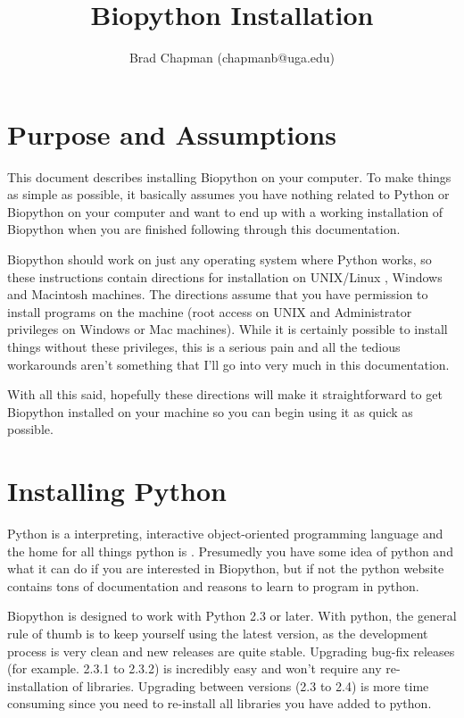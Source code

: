 \documentclass{article}
\begin{document}
\title{Biopython Installation}
\author{Brad Chapman (chapmanb@uga.edu)}

\maketitle
\tableofcontents

\section{Purpose and Assumptions}

This document describes installing Biopython on your computer. To make
things as simple as possible, it basically assumes you have nothing
related to Python or Biopython on your computer and want to end up with
a working installation of Biopython when you are finished following
through this documentation. 


Biopython should work on just any operating system where Python works,
so these instructions contain directions for installation on UNIX/Linux
, Windows and Macintosh machines. The directions assume 
that you have permission to install programs on the machine
(root access on UNIX and Administrator privileges on Windows or Mac
machines). While it is certainly possible to install things without
these privileges, this is a serious pain and all the tedious workarounds
aren't something that I'll go into very much in this documentation.

With all this said, hopefully these directions will make it
straightforward to get Biopython installed on your machine so you can
begin using it as quick as possible.

\section{Installing Python}

Python is a interpreting, interactive object-oriented programming
language and the home for all things python is
. Presumedly you have some idea of
python and what it can do if you are interested in Biopython, but if not
the python website contains tons of documentation and reasons to learn
to program in python.


Biopython is designed to work with Python 2.3 or later. With python, the
general rule of thumb is to keep yourself using the latest version, as
the development process is very clean and new releases are quite stable.
Upgrading bug-fix releases (for example. 2.3.1 to 2.3.2) 
is incredibly easy and won't require any re-installation of libraries.
Upgrading between versions (2.3 to 2.4) is more time consuming since you
need to re-install all libraries you have added to python.
\end{document}
